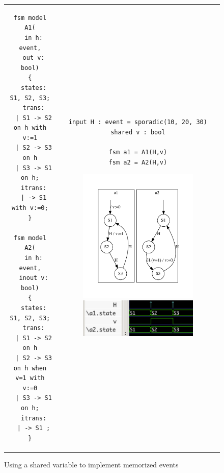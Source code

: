 \begin{figure}[h]
  \centering
\begin{tabular}[c]{cc}
  \begin{minipage}[b]{0.3\linewidth}
  \begin{lstlisting}[language=Rfsm]
fsm model A1(
  in h: event,
  out v: bool)
{
  states: S1, S2, S3;
  trans:
  | S1 -> S2 on h with v:=1
  | S2 -> S3 on h
  | S3 -> S1 on h;
  itrans:
  | -> S1 with v:=0;
}

fsm model A2(
  in h: event,
  inout v: bool)
{
  states: S1, S2, S3;
  trans:
  | S1 -> S2 on h
  | S2 -> S3 on h when v=1 with v:=0
  | S3 -> S1 on h;
  itrans:
  | -> S1 ;
}
  \end{lstlisting}
  \end{minipage} &
  \begin{minipage}[b]{0.7\linewidth}
\begin{lstlisting}[language=Rfsm]
input H : event = sporadic(10, 20, 30)
shared v : bool

fsm a1 = A1(H,v)
fsm a2 = A2(H,v)
\end{lstlisting}
\includegraphics[width=0.7\textwidth]{figs/sync-sv2-model}
\includegraphics[width=0.7\textwidth]{figs/sync-sv2-chrono}
  \end{minipage}
\end{tabular}
  \caption{Using a shared variable to implement memorized events}
  \label{fig:sync-sv2}
\end{figure}

